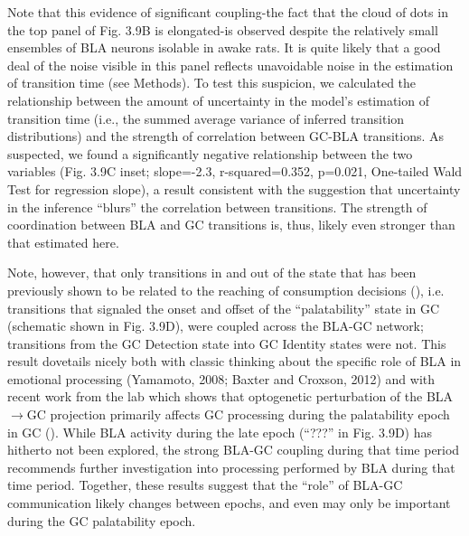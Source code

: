 \begin{refsection}
Note that this evidence of significant coupling-the fact that the cloud of dots in the top panel of Fig. 3.9B is elongated-is observed despite the relatively small ensembles of BLA neurons isolable in awake rats. It is quite likely that a good deal of the noise visible in this panel reflects unavoidable noise in the estimation of transition time (see Methods). To test this suspicion, we calculated the relationship between the amount of uncertainty in the model’s estimation of transition time (i.e., the summed average variance of inferred transition distributions) and the strength of correlation between GC-BLA transitions. As suspected, we found a significantly negative relationship between the two variables (Fig. 3.9C inset; slope=-2.3, r-squared=0.352, p=0.021, One-tailed Wald Test for regression slope), a result consistent with the suggestion that uncertainty in the inference “blurs” the correlation between transitions. The strength of coordination between BLA and GC transitions is, thus, likely even stronger than that estimated here.

Note, however, that only transitions in and out of the state that has been previously shown to be related to the reaching of consumption decisions (\cite{sadacca2016a}), i.e. transitions that signaled the onset and offset of the “palatability” state in GC (schematic shown in Fig. 3.9D), were coupled across the BLA-GC network; transitions from the GC Detection state into GC Identity states were not. This result dovetails nicely both with classic thinking about the specific role of BLA in emotional processing (Yamamoto, 2008; Baxter and Croxson, 2012) and with recent work from the lab which shows that optogenetic perturbation of the BLA$\rightarrow$GC projection primarily affects GC processing during the palatability epoch in GC (\cite{lin2021a}). While BLA activity during the late epoch (“???” in Fig. 3.9D) has hitherto not been explored, the strong BLA-GC coupling during that time period recommends further investigation into processing performed by BLA during that time period. Together, these results suggest that the “role” of BLA-GC communication likely changes between epochs, and even may only be important during the GC palatability epoch.


\end{refsection}
